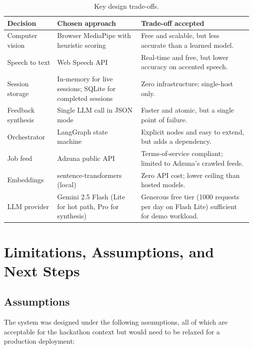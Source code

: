 \documentclass[11pt,a4paper]{article}
\begin{document}
\begin{table}[!htbp]
\centering
\small
\caption{Key design trade-offs.}
\label{tab:tradeoffs}
\begin{tabular}{p{3.4cm} p{4.5cm} p{6cm}}
\toprule
\textbf{Decision} & \textbf{Chosen approach} & \textbf{Trade-off accepted} \\
\midrule
Computer vision & Browser MediaPipe with heuristic scoring & Free and scalable, but less accurate than a learned model. \\
\addlinespace
Speech to text & Web Speech API & Real-time and free, but lower accuracy on accented speech. \\
\addlinespace
Session storage & In-memory for live sessions; SQLite for completed sessions & Zero infrastructure; single-host only. \\
\addlinespace
Feedback synthesis & Single LLM call in JSON mode & Faster and atomic, but a single point of failure. \\
\addlinespace
Orchestrator & LangGraph state machine & Explicit nodes and easy to extend, but adds a dependency. \\
\addlinespace
Job feed & Adzuna public API & Terms-of-service compliant; limited to Adzuna's crawled feeds. \\
\addlinespace
Embeddings & sentence-transformers (local) & Zero API cost; lower ceiling than hosted models. \\
\addlinespace
LLM provider & Gemini 2.5 Flash (Lite for hot path, Pro for synthesis) & Generous free tier (1000 requests per day on Flash Lite) sufficient for demo workload. \\
\bottomrule
\end{tabular}
\end{table}

\section{Limitations, Assumptions, and Next Steps}

\subsection{Assumptions}

The system was designed under the following assumptions, all of which are
acceptable for the hackathon context but would need to be relaxed for a
production deployment:
\end{document}

